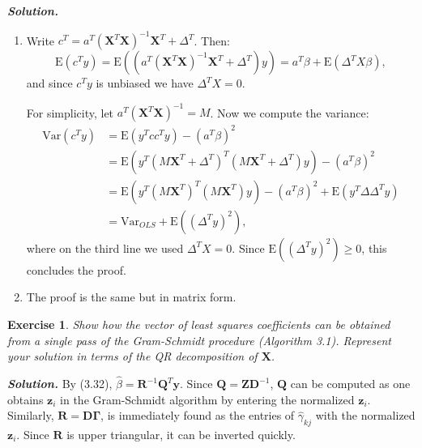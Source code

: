 \documentclass[12pt]{article}
\def\bQ{\textbf{Q}}
\def\bz{\textbf{z}}
\def\bX{\textbf{X}}
\def\by{\textbf{y}}
\def\bR{\textbf{R}}
\def\bQ{\textbf{Q}}
\def\bD{\textbf{D}}
\def\bZ{\textbf{Z}}
\def\bGamma{\mathbf{\Gamma}}
\def\E{\text{E}}
\def\var{\text{Var}}
\newtheorem{exercise}{Exercise}[section]
\newenvironment{solution}[1][\it{Solution}]{\textbf{#1. } }{\vspace{.5cm}}
\begin{document}
\begin{solution}
    \begin{enumerate}
    \item [(a)] Write $c^T = a^T (\bX^T \bX)^{-1} \bX^T + \Delta^T$. Then:
    $$\E(c^T y) = \E((a^T (\bX^T \bX)^{-1} \bX^T + \Delta^T)y) = a^T \beta + \E(\Delta^T X \beta),$$
    and since $c^T y$ is unbiased we have $\Delta^T X = 0$.

    For simplicity, let $a^T (\bX^T \bX)^{-1} = M$. Now we compute the variance:
    $$\begin{aligned} \var(c^Ty) &= \E(y^T c c^T y) - (a^T\beta)^2 \\
    &= \E(y^T (M\bX^T + \Delta^T)^T (M\bX^T + \Delta^T) y) - (a^T\beta)^2 \\
    &= \E(y^T(M\bX^T)^T(M\bX^T)y) - (a^T\beta)^2 + \E(y^T\Delta\Delta^Ty) \\
    &= \var_{OLS} + \E((\Delta^T y)^2),
    \end{aligned}$$
    where on the third line we used $\Delta^T X  = 0$. Since $\E((\Delta^T y)^2) \geq 0$, this concludes the proof.

    \item [(b)] The proof is the same but in matrix form.
    \end{enumerate}
\end{solution}

\begin{exercise} Show how the vector of least squares coefficients can be obtained from a single pass of the Gram-Schmidt procedure (Algorithm 3.1). Represent your solution in terms of the QR decomposition of $\bX$.
\end{exercise}
\begin{solution}
    By (3.32), $\hat{\beta} = \bR^{-1}\bQ^T \by$. Since $\bQ = \bZ \bD^{-1}$, $\bQ$ can be computed as one obtains $\bz_i$ in the Gram-Schmidt algorithm by entering the normalized $\bz_i$. Similarly, $\bR = \bD \bGamma$, is immediately found as the entries of $\hat{\gamma}_{kj}$ with the normalized $\bz_i$. Since $\bR$ is upper triangular, it can be inverted quickly.
\end{solution}
\end{document}
